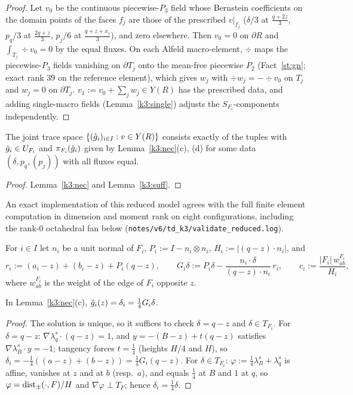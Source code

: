 \begin{proof}
Let $v_0$ be the continuous piecewise-$P_3$ field whose Bernstein coefficients on the domain points of the faces $f_j$ are those of the prescribed $v|_{f_j}$ ($\delta/3$ at $\frac{q+2z}3$, $p_q/3$ at $\frac{2q+z}3$, $p_j/6$ at $\frac{q+z+x_j}3$), and zero elsewhere. Then $v_0=0$ on $\partial R$ and $\int_{T_j}\div v_0=0$ by the equal fluxes. On each Alfeld macro-element, $\div$ maps the piecewise-$P_3$ fields vanishing on $\partial T_j$ onto the mean-free piecewise $P_2$ (Fact~\ref{st:gn}; exact rank $39$ on the reference element), which gives $w_j$ with $\div w_j=-\div v_0$ on $T_j$ and $w_j=0$ on $\partial T_j$. $v_1:=v_0+\sum_jw_j\in Y(R)$ has the prescribed data, and adding single-macro fields (Lemma~\ref{k3:single}) adjusts the $S_{F_i}$-components independently.
\end{proof}

\begin{theorem}\label{k3:trace}
The joint trace space $\{(\hat g_i)_{i\in I}:v\in Y(R)\}$ consists exactly of the tuples with $\hat g_i\in U_{F_i}$ and $\pi_{F_i}(\hat g_i)$ given by Lemma~\ref{k3:nec}(c), (d) for some data $(\delta,p_q,(p_j))$ with all fluxes equal.
\end{theorem}

\begin{proof}
Lemma~\ref{k3:nec} and Lemma~\ref{k3:suff}.
\end{proof}
An exact implementation of this reduced model agrees with the full finite element computation in dimension and moment rank on eight configurations, including the rank-$0$ octahedral fan below (\texttt{notes/v6/td\_k3/validate\_reduced.log}).

For $i\in I$ let $n_i$ be a unit normal of $F_i$, $P_i:=I-n_i\otimes n_i$, $H_i:=|(q-z)\cdot n_i|$, and
\[
r_i:=(a_i-z)+(b_i-z)+P_i(q-z),\qquad G_i\delta:=P_i\delta-\frac{n_i\cdot\delta}{(q-z)\cdot n_i}\,r_i,\qquad c_i:=\frac{|F_i|\,w^{F_i}_{ab}}{H_i},
\]
where $w^{F_i}_{ab}$ is the weight of the edge of $F_i$ opposite $z$.

\begin{lemma}\label{k3:jet}
In Lemma~\ref{k3:nec}(c), $\hat g_i(z)=\delta_i=\frac14G_i\delta$.
\end{lemma}

\begin{proof}
The solution is unique, so it suffices to check $\delta=q-z$ and $\delta\in T_{F_i}$. For $\delta=q-z$: $\nabla\lambda_q^s\cdot(q-z)=1$, and $y=-(B-z)+t(q-z)$ satisfies $\nabla\lambda_B^s\cdot y=-1$; tangency forces $t=\frac14$ (heights $H/4$ and $H$), so $\delta_i=-\frac14((a-z)+(b-z))=\frac14G_i(q-z)$. For $\delta\in T_{F_i}$: $\varphi:=\frac14\lambda_B^s+\lambda_q^s$ is affine, vanishes at $z$ and at $b$ (resp.\ $a$), and equals $\frac14$ at $B$ and $1$ at $q$, so $\varphi=\operatorname{dist}_\pm(\cdot,F)/H$ and $\nabla\varphi\perp T_F$; hence $\delta_i=\frac14\delta$.
\end{proof}

